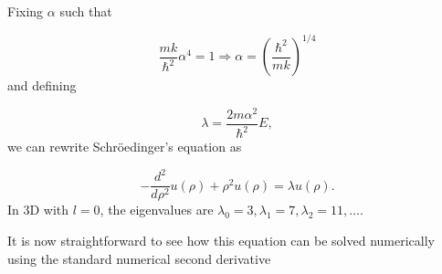 \documentclass[10pt,showpacs,preprintnumbers,footinbib,amsmath,amssymb,aps,prl,twocolumn,groupedaddress,superscriptaddress,showkeys]{revtex4-1}
\begin{document}
Fixing $\alpha$ such that

\begin{equation*}
\frac{mk}{\hbar^2} \alpha^4 = 1 \Rightarrow \alpha = \left(\frac{\hbar^2}{mk}\right)^{1/4}
\end{equation*}
and defining

\begin{equation*}
\lambda = \frac{2m\alpha^2}{\hbar^2}E,
\end{equation*}
we can rewrite Schr\"{o}edinger's equation as

\begin{equation}
  -\frac{d^2}{d\rho^2} u(\rho) + \rho^2u(\rho)  = \lambda u(\rho) .
\label{eq:1bseq}
\end{equation}
In 3D with $l=0$, the eigenvalues are
$\lambda_0=3,\lambda_1=7,\lambda_2=11,\dots .$

It is now straightforward to see how this equation can be solved numerically using the standard
numerical second derivative
\end{document}
